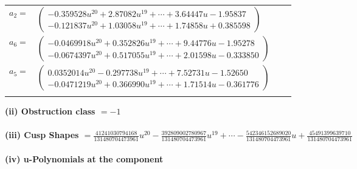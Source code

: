 \documentclass[1p]{elsarticle_modified}
\theoremstyle{definition}
\begin{document}
\begin{tabular}{m{7pt} m{180pt} m{7pt} m{180pt} }
\flushright $a_{2}=$&$\begin{pmatrix}-0.359528 u^{20}+2.87082 u^{19}+\cdots+3.64447 u-1.95837\\-0.121837 u^{20}+1.03058 u^{19}+\cdots+1.74858 u+0.385598\end{pmatrix}$ \\
\flushright $a_{6}=$&$\begin{pmatrix}-0.0469918 u^{20}+0.352826 u^{19}+\cdots+9.44776 u-1.95278\\-0.0674397 u^{20}+0.517055 u^{19}+\cdots+2.01598 u-0.333850\end{pmatrix}$ \\
\flushright $a_{5}=$&$\begin{pmatrix}0.0352014 u^{20}-0.297738 u^{19}+\cdots+7.52731 u-1.52650\\-0.0471219 u^{20}+0.366990 u^{19}+\cdots+1.71514 u-0.361776\end{pmatrix}$\\&\end{tabular}
\flushleft \textbf{(ii) Obstruction class $= -1$}\\~\\
\flushleft \textbf{(iii) Cusp Shapes $= \frac{41241030794168}{131480704473961} u^{20}-\frac{392809002780967}{131480704473961} u^{19}+\cdots-\frac{542346152689020}{131480704473961} u+\frac{45491399639710}{131480704473961}$}\\~\\
\newpage\renewcommand{\arraystretch}{1}
\flushleft \textbf{(iv) u-Polynomials at the component}\newline \\
\end{document}
